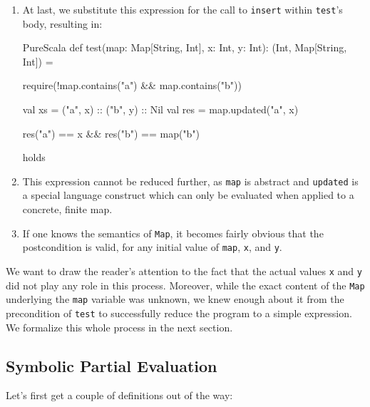 \documentclass[a4paper,twoside]{article}
\newcommand{\stt}[1]{\texttt{\small{#1}}}
\begin{document}
\begin{enumerate}
\begin{ShortCode}{PureScala}
map.updated("a", x)
\end{ShortCode}

\item At last, we substitute this expression for the call to \stt{insert} within \stt{test}'s body, resulting in:

\begin{ShortCode}{PureScala}
def test(map: Map[String, Int], x: Int, y: Int): (Int, Map[String, Int]) = {
  require(!map.contains("a") && map.contains("b"))

  val xs  = ("a", x) :: ("b", y) :: Nil
  val res = map.updated("a", x)

  res("a") == x && res("b") == map("b")
} holds
\end{ShortCode}

\item This expression cannot be reduced further, as \stt{map} is abstract and \stt{updated} is a special language construct which can only be evaluated when applied to a concrete, finite map.

\item If one knows the semantics of \stt{Map}, it becomes fairly obvious that the postcondition is valid, for any initial value of \stt{map}, \stt{x}, and \stt{y}.

\end{enumerate}

We want to draw the reader's attention to the fact that the actual values \stt{x} and \stt{y} did not play any role in this process. Moreover, while the exact content of the \stt{Map} underlying the \stt{map} variable was unknown, we knew enough about it from the precondition of \stt{test} to successfully reduce the program to a simple expression. We formalize this whole process in the next section.

\subsection{Symbolic Partial Evaluation}

Let's first get a couple of definitions out of the way:
\end{document}
